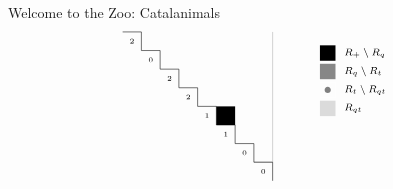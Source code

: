 \documentclass{beamer}
\newcommand{\mymidgray}{black!47}  %
\newcounter{c}
\begin{document}
\begin{frame}{Welcome to the Zoo: Catalanimals}
\[\begin{array}{@{\hspace{0.2mm}}c@{\quad\quad}cr}
{\begin{tikzpicture}[scale=.47]
\begin{scope}
\draw[thin, black!31] (8,-8) -- (9,-8);
\draw[thin, black!31] (9,-8) -- (9,-1);
\draw[draw = none, fill = black!100] (6,-5) rectangle (7,-6);
 \draw[thin] (1,-1) -- (2,-1);
\draw[thin] (2,-1) -- (2,-2);
\draw[thin] (2,-2) -- (3,-2);
\draw[thin] (3,-2) -- (3,-3);
\draw[thin] (3,-3) -- (4,-3);
\draw[thin] (4,-3) -- (4,-4);
\draw[thin] (4,-4) -- (5,-4);
\draw[thin] (5,-4) -- (5,-5);
\draw[thin] (5,-5) -- (6,-5);
\draw[thin] (6,-5) -- (6,-6);
\draw[thin] (6,-6) -- (7,-6);
\draw[thin] (7,-6) -- (7,-7);
\draw[thin] (7,-7) -- (8,-7);
\draw[thin] (8,-7) -- (8,-8);
\draw[thin] (8,-8) -- (9,-8);
\draw[thin] (9,-8) -- (9,-9);
\node at (3/2,-3/2) {\tiny $2 $};
\node at (5/2,-5/2) {\tiny $0 $};
\node at (7/2,-7/2) {\tiny $2 $};
\node at (9/2,-9/2) {\tiny $2 $};
\node at (11/2,-11/2) {\tiny $1 $};
\node at (13/2,-13/2) {\tiny $1 $};
\node at (15/2,-15/2) {\tiny $0 $};
\node (vv) at (17/2,-17/2) {\tiny $0 $};
\end{scope}
\end{tikzpicture} }
&
\ \ \
\raisebox{16mm}{
\begin{tikzpicture}[scale = .39]
\begin{scope}
\draw[draw = none, fill = black!100] (2,-1) rectangle (3,-2);
\node[anchor = west] at (3,-1.5) {\scriptsize  \  $R_+ \setminus R_q$};
\end{scope}
\begin{scope}[yshift = -34*1]
\draw[draw = none, fill = \mymidgray] (2,-1) rectangle (3,-2);
\node[anchor = west] at (3,-1.5) {\scriptsize  \  $R_q \setminus R_t$};
\end{scope}
\begin{scope}[yshift = -34*2]
\draw[thin, black!0] (2,-1) -- (3,-1);
\draw[thin, black!0] (2,-1) -- (2,-2);
\draw[thin, black!0] (2,-2) -- (3,-2);
\draw[thin, black!0] (3,-2) -- (3,-1);
\draw[draw = none, fill = gray!100] (2+0.5, -1-0.5) circle (.2);
\node[anchor = west] at (3,-1.5) {\scriptsize  \  $R_t \setminus R_{qt}$};
\end{scope}
\begin{scope}[yshift = -34*3]
\draw[draw = none, fill = black!14] (2,-1) rectangle (3,-2);
\node[anchor = west] at (3,-1.5) {\scriptsize \  $R_{qt}$};
\end{scope}
\end{tikzpicture}}
\end{array}
\]
\end{frame}
\end{document}
